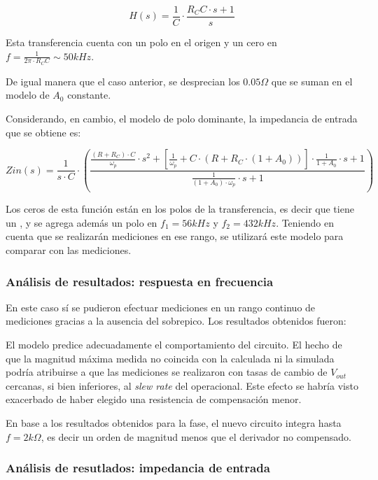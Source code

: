 \documentclass[../../main.tex]{subfiles}
\begin{document}
\[ H(s) = \frac{1}{C} \cdot \frac{R_C C \cdot s + 1}{s} \]
 
 Esta transferencia cuenta con un polo en el origen y un cero en $f = \frac{1}{2\pi \cdot R_C C} \sim 50kHz$.\par

De igual manera que el caso anterior, se desprecian los $0.05\Omega$ que se suman en el modelo de $A_0$ constante.\par

Considerando, en cambio, el modelo de polo dominante, la impedancia de entrada que se obtiene es:

\begin{equation}Z{in}(s) = \frac{1} {s \cdot C} \cdot \left(\frac{ \frac{(R+R_C)\cdot C}{\omega_p}\cdot s^2 +  [\frac{1}{\omega_p}+ C\cdot(R+R_C\cdot(1+A_0))]\cdot \frac{1}{1+A_0}\cdot s + 1 }{ \frac{1}{(1+A_0)\cdot \omega_p}\cdot s + 1 }\right)\end{equation}

Los ceros de esta funci\'on est\'an en los polos de la transferencia, es decir que tiene un , y se agrega adem\'as un polo en $f_1 =  56kHz$ y $f_2 = 432kHz$. Teniendo en cuenta que se realizar\'an mediciones en ese rango, se utilizar\'a este modelo para comparar con las mediciones.

\subsubsection{An\'alisis de resultados: respuesta en frecuencia}

En este caso s\'i se pudieron efectuar mediciones en un rango continuo de mediciones gracias a la ausencia del sobrepico. Los resultados obtenidos fueron:


El modelo predice adecuadamente el comportamiento del circuito. El hecho de que la magnitud m\'axima medida no coincida con la calculada ni la simulada podr\'ia atribuirse a que las mediciones se realizaron con tasas de cambio de $V_{out}$ cercanas, si bien inferiores, al \textit{slew rate} del operacional. Este efecto se habr\'ia visto exacerbado de haber elegido una resistencia de compensaci\'on menor.\par

En base a los resultados obtenidos para la fase, el nuevo circuito integra hasta $f = 2k\Omega$, es decir un orden de magnitud menos que el derivador no compensado.


\subsubsection{An\'alisis de resutlados: impedancia de entrada}
\end{document}
